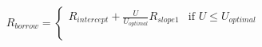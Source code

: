 \documentclass[preview]{standalone}
\begin{document}
\begin{align*}
R_{borrow} = \begin{cases} R_{intercept} + \frac{U}{U_{optimal}}R_{slope1} & \text{if } U \leq U_{optimal} \\ \text{} \\ \text{} \end{cases}
\end{align*}
\end{document}
